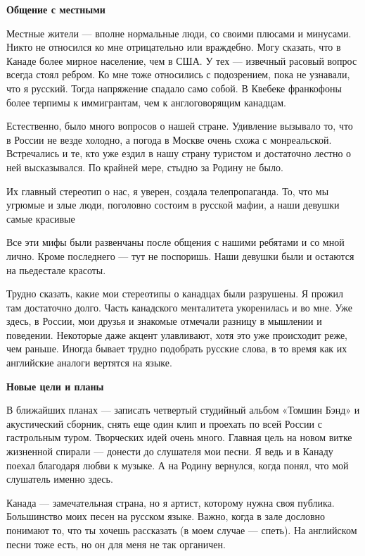 \textbf{Общение с местными}

Местные жители — вполне нормальные люди, со своими плюсами и минусами. Никто не относился ко мне отрицательно или враждебно. Могу сказать, что в Канаде более мирное население, чем в США. У тех — извечный расовый вопрос всегда стоял ребром. Ко мне тоже относились с подозрением, пока не узнавали, что я русский. Тогда напряжение спадало само собой. В Квебеке франкофоны более терпимы к иммигрантам, чем к англоговорящим канадцам.

Естественно, было много вопросов о нашей стране. Удивление вызывало то, что в России не везде холодно, а погода в Москве очень схожа с монреальской. Встречались и те, кто уже ездил в нашу страну туристом и достаточно лестно о ней высказывался. По крайней мере, стыдно за Родину не было.

\begin{fancyquotes}
    Их главный стереотип о нас, я уверен, создала телепропаганда. То, что мы угрюмые и злые люди, поголовно состоим в русской мафии, а наши девушки самые красивые
\end{fancyquotes}

Все эти мифы были развенчаны после общения с нашими ребятами и со мной лично. Кроме последнего — тут не поспоришь. Наши девушки были и остаются на пьедестале красоты.

Трудно сказать, какие мои стереотипы о канадцах были разрушены. Я прожил там достаточно долго. Часть канадского менталитета укоренилась и во мне. Уже здесь, в России, мои друзья и знакомые отмечали разницу в мышлении и поведении. Некоторые даже акцент улавливают, хотя это уже происходит реже, чем раньше. Иногда бывает трудно подобрать русские слова, в то время как их английские аналоги вертятся на языке.

\textbf{Новые цели и планы}

В ближайших планах — записать четвертый студийный альбом «Томшин Бэнд» и акустический сборник, снять еще один клип и проехать по всей России с гастрольным туром. Творческих идей очень много. Главная цель на новом витке жизненной спирали — донести до слушателя мои песни. Я ведь и в Канаду поехал благодаря любви к музыке. А на Родину вернулся, когда понял, что мой слушатель именно здесь.

Канада — замечательная страна, но я артист, которому нужна своя публика. Большинство моих песен на русском языке. Важно, когда в зале дословно понимают то, что ты хочешь рассказать (в моем случае — спеть). На английском песни тоже есть, но он для меня не так органичен.

